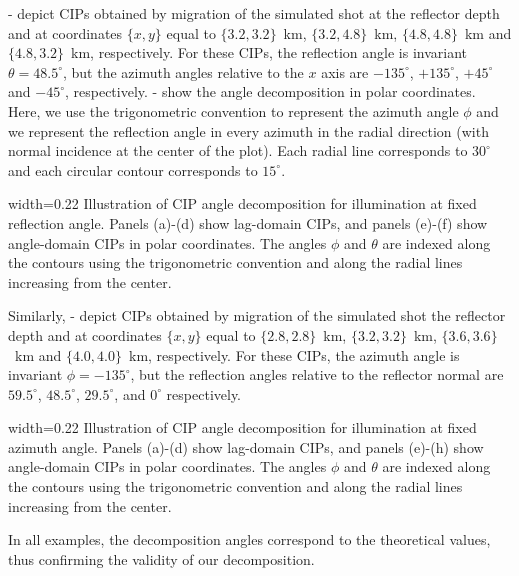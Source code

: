 
- depict CIPs obtained by migration of the
simulated shot at the reflector depth and at coordinates $\{x,y\}$
equal to $\{3.2,3.2\}$~km, $\{3.2,4.8\}$~km, $\{4.8,4.8\}$~km and
$\{4.8,3.2\}$~km, respectively. For these CIPs, the reflection angle
is invariant $\theta=48.5^\circ$, but the azimuth angles relative to
the $x$ axis are $-135^\circ$, $+135^\circ$, $+45^\circ$ and
$-45^\circ$, respectively. - show the angle
decomposition in polar coordinates.  Here, we use the trigonometric
convention to represent the azimuth angle $\phi$ and we represent the
reflection angle in every azimuth in the radial direction (with normal
incidence at the center of the plot). Each radial line corresponds to
$30^\circ$ and each circular contour corresponds to $15^\circ$.

{width=0.22\textwidth}{ Illustration of CIP angle decomposition for
  illumination at fixed reflection angle. Panels (a)-(d) show
  lag-domain CIPs, and panels (e)-(f) show angle-domain CIPs in polar
  coordinates. The angles $\phi$ and $\theta$ are indexed along the
  contours using the trigonometric convention and along the radial
  lines increasing from the center.}

Similarly, - depict CIPs obtained by migration
of the simulated shot the reflector depth and at coordinates $\{x,y\}$
equal to $\{2.8,2.8\}$~km, $\{3.2,3.2\}$~km, $\{3.6,3.6\}$~km and
$\{4.0,4.0\}$~km, respectively.  For these CIPs, the azimuth angle is
invariant $\phi=-135^\circ$, but the reflection angles relative to the
reflector normal are $59.5^\circ$, $48.5^\circ$, $29.5^\circ$, and
$0^\circ$ respectively.

{width=0.22\textwidth}{ Illustration of CIP angle decomposition for
  illumination at fixed azimuth angle.  Panels (a)-(d) show lag-domain
  CIPs, and panels (e)-(h) show angle-domain CIPs in polar
  coordinates. The angles $\phi$ and $\theta$ are indexed along the
  contours using the trigonometric convention and along the radial
  lines increasing from the center.}

In all examples, the decomposition angles correspond to the
theoretical values, thus confirming the validity of our decomposition.
